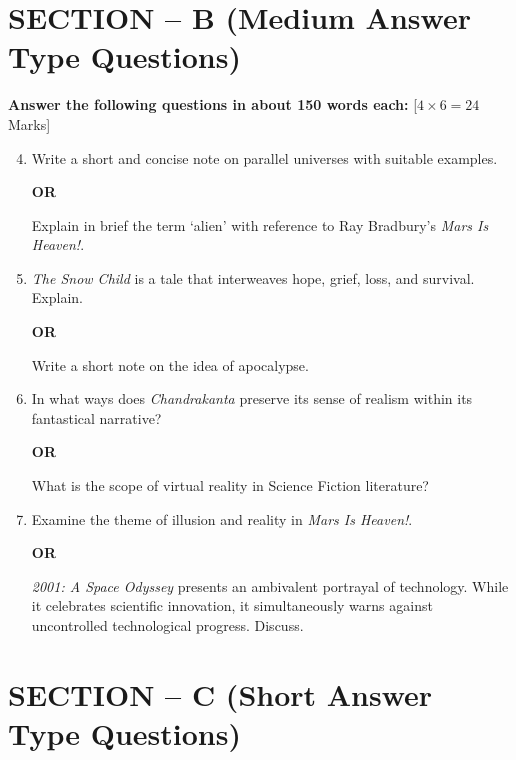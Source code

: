 \documentclass[11pt,a4paper]{article}
\begin{document}
\section*{SECTION -- B (Medium Answer Type Questions)}



\noindent   \textbf{Answer the following questions in about 150 words each:} \hfill [$4  \times 6 = 24$ Marks]


\begin{enumerate}[label=   \textbf{\arabic*.}]
    \setcounter{enumii}{3}
    \item Write a short and concise note on parallel universes with suitable examples.
    
\begin{center}   \textbf{OR}\end{center}
    Explain in brief the term `alien' with reference to Ray Bradbury's   \textit{Mars Is Heaven!}.

    \item   \textit{The Snow Child} is a tale that interweaves hope, grief, loss, and survival. Explain.
    
\begin{center}   \textbf{OR}\end{center}
    Write a short note on the idea of apocalypse.

    \item In what ways does   \textit{Chandrakanta} preserve its sense of realism within its fantastical narrative?
    
\begin{center}   \textbf{OR}\end{center}
    What is the scope of virtual reality in Science Fiction literature?

    \item Examine the theme of illusion and reality in   \textit{Mars Is Heaven!}.
    
\begin{center}   \textbf{OR}\end{center}
   \textit{2001: A Space Odyssey} presents an ambivalent portrayal of technology. While it celebrates scientific innovation, it simultaneously warns against uncontrolled technological progress. Discuss.
\end{enumerate}

\section*{SECTION -- C (Short Answer Type Questions)}
\end{document}
